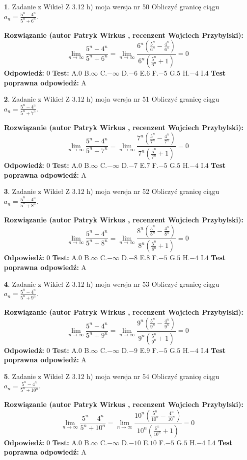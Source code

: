 \documentclass[12pt, a4paper]{article}
\theoremstyle{definition} %
\newtheorem{zad}{}
\newcommand{\zadStart}[1]{\begin{zad}#1\newline}
\newcommand{\zadStop}{\end{zad}}
\newcommand{\rozwStart}[2]{\noindent \textbf{Rozwiązanie (autor #1 , recenzent #2): }\newline}
\newcommand{\rozwStop}{\newline}
\newcommand{\odpStart}{\noindent \textbf{Odpowiedź:}\newline}
\newcommand{\odpStop}{\newline}
\newcommand{\testStart}{\noindent \textbf{Test:}\newline}
\newcommand{\testStop}{\newline}
\newcommand{\kluczStart}{\noindent \textbf{Test poprawna odpowiedź:}\newline}
\newcommand{\kluczStop}{\newline}
\begin{document}
\zadStart{Zadanie z Wikieł Z 3.12 h) moja wersja nr 50}
Obliczyć granicę ciągu $a_{n}=\frac{5^{n} - 4^{n}}{5^{n} + 6^{n}}$.
\zadStop
\rozwStart{Patryk Wirkus}{Wojciech Przybylski}
$$\lim\limits_{n\to\infty}\frac{5^{n} - 4^{n}}{5^{n} + 6^{n}} = \lim\limits_{n\to\infty}\frac{6^{n}(\frac{5^{n}}{6^{n}} - \frac{4^{n}}{6^{n}})}{6^{n}(\frac{5^{n}}{6^{n}} + 1)} = 0$$
\rozwStop
\odpStart
$0$
\odpStop
\testStart
A.$0$
B.$\infty$
C.$-\infty$
D.$-6$
E.$6$
F.$-5$
G.$5$
H.$-4$
I.$4$
\testStop
\kluczStart
A
\kluczStop



\zadStart{Zadanie z Wikieł Z 3.12 h) moja wersja nr 51}
Obliczyć granicę ciągu $a_{n}=\frac{5^{n} - 4^{n}}{5^{n} + 7^{n}}$.
\zadStop
\rozwStart{Patryk Wirkus}{Wojciech Przybylski}
$$\lim\limits_{n\to\infty}\frac{5^{n} - 4^{n}}{5^{n} + 7^{n}} = \lim\limits_{n\to\infty}\frac{7^{n}(\frac{5^{n}}{7^{n}} - \frac{4^{n}}{7^{n}})}{7^{n}(\frac{5^{n}}{7^{n}} + 1)} = 0$$
\rozwStop
\odpStart
$0$
\odpStop
\testStart
A.$0$
B.$\infty$
C.$-\infty$
D.$-7$
E.$7$
F.$-5$
G.$5$
H.$-4$
I.$4$
\testStop
\kluczStart
A
\kluczStop



\zadStart{Zadanie z Wikieł Z 3.12 h) moja wersja nr 52}
Obliczyć granicę ciągu $a_{n}=\frac{5^{n} - 4^{n}}{5^{n} + 8^{n}}$.
\zadStop
\rozwStart{Patryk Wirkus}{Wojciech Przybylski}
$$\lim\limits_{n\to\infty}\frac{5^{n} - 4^{n}}{5^{n} + 8^{n}} = \lim\limits_{n\to\infty}\frac{8^{n}(\frac{5^{n}}{8^{n}} - \frac{4^{n}}{8^{n}})}{8^{n}(\frac{5^{n}}{8^{n}} + 1)} = 0$$
\rozwStop
\odpStart
$0$
\odpStop
\testStart
A.$0$
B.$\infty$
C.$-\infty$
D.$-8$
E.$8$
F.$-5$
G.$5$
H.$-4$
I.$4$
\testStop
\kluczStart
A
\kluczStop



\zadStart{Zadanie z Wikieł Z 3.12 h) moja wersja nr 53}
Obliczyć granicę ciągu $a_{n}=\frac{5^{n} - 4^{n}}{5^{n} + 9^{n}}$.
\zadStop
\rozwStart{Patryk Wirkus}{Wojciech Przybylski}
$$\lim\limits_{n\to\infty}\frac{5^{n} - 4^{n}}{5^{n} + 9^{n}} = \lim\limits_{n\to\infty}\frac{9^{n}(\frac{5^{n}}{9^{n}} - \frac{4^{n}}{9^{n}})}{9^{n}(\frac{5^{n}}{9^{n}} + 1)} = 0$$
\rozwStop
\odpStart
$0$
\odpStop
\testStart
A.$0$
B.$\infty$
C.$-\infty$
D.$-9$
E.$9$
F.$-5$
G.$5$
H.$-4$
I.$4$
\testStop
\kluczStart
A
\kluczStop



\zadStart{Zadanie z Wikieł Z 3.12 h) moja wersja nr 54}
Obliczyć granicę ciągu $a_{n}=\frac{5^{n} - 4^{n}}{5^{n} + 10^{n}}$.
\zadStop
\rozwStart{Patryk Wirkus}{Wojciech Przybylski}
$$\lim\limits_{n\to\infty}\frac{5^{n} - 4^{n}}{5^{n} + 10^{n}} = \lim\limits_{n\to\infty}\frac{10^{n}(\frac{5^{n}}{10^{n}} - \frac{4^{n}}{10^{n}})}{10^{n}(\frac{5^{n}}{10^{n}} + 1)} = 0$$
\rozwStop
\odpStart
$0$
\odpStop
\testStart
A.$0$
B.$\infty$
C.$-\infty$
D.$-10$
E.$10$
F.$-5$
G.$5$
H.$-4$
I.$4$
\testStop
\kluczStart
A
\kluczStop
\end{document}
